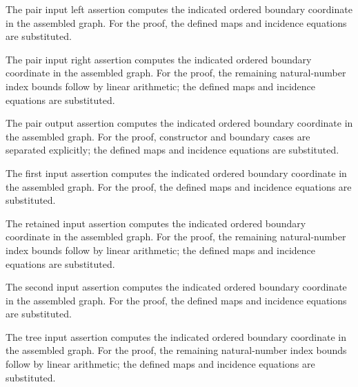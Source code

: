The pair input left assertion computes the indicated ordered boundary coordinate in the assembled graph.
For the proof, the defined maps and incidence equations are substituted.
\par{}

The pair input right assertion computes the indicated ordered boundary coordinate in the assembled graph.
For the proof, the remaining natural-number index bounds follow by linear arithmetic; the defined maps and incidence equations are substituted.
\par{}

The pair output assertion computes the indicated ordered boundary coordinate in the assembled graph.
For the proof, constructor and boundary cases are separated explicitly; the defined maps and incidence equations are substituted.
\par{}

The first input assertion computes the indicated ordered boundary coordinate in the assembled graph.
For the proof, the defined maps and incidence equations are substituted.
\par{}

The retained input assertion computes the indicated ordered boundary coordinate in the assembled graph.
For the proof, the remaining natural-number index bounds follow by linear arithmetic; the defined maps and incidence equations are substituted.
\par{}

The second input assertion computes the indicated ordered boundary coordinate in the assembled graph.
For the proof, the defined maps and incidence equations are substituted.
\par{}

The tree input assertion computes the indicated ordered boundary coordinate in the assembled graph.
For the proof, the remaining natural-number index bounds follow by linear arithmetic; the defined maps and incidence equations are substituted.
\par{}

